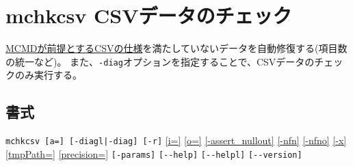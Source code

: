 

%

\section{mchkcsv CSVデータのチェック\label{sect:mchkcsv}}
\hyperref[sect:csv]{MCMDが前提とするCSVの仕様}を満たしていないデータを自動修復する(項目数の統一など)。
また、\verb|-diag|オプションを指定することで、CSVデータのチェックのみ実行する。

\subsection*{書式}
\verb/mchkcsv [a=] [-diagl|-diag] [-r]/
\hyperref[sect:option_o]{[i=]}
\hyperref[sect:option_o]{[o=]}
\hyperref[sect:option_assert_nullout]{[-assert\_nullout]}
\hyperref[sect:option_nfn]{[-nfn]} 
\hyperref[sect:option_nfno]{[-nfno]}  
\hyperref[sect:option_x]{[-x]}
\hyperref[sect:option_option_tmppath]{[tmpPath=]}
\hyperref[sect:option_precision]{[precision=]}
\verb|[-params]|
\verb|[--help]|
\verb|[--helpl]|
\verb|[--version]|\\

